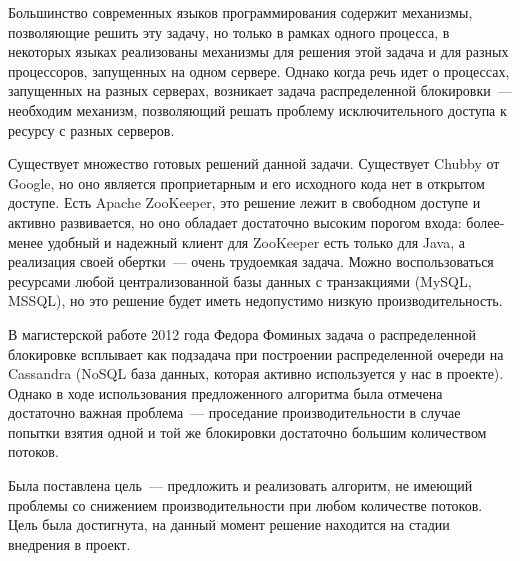 Большинство современных языков программирования содержит механизмы, позволяющие решить эту задачу, но только в рамках одного процесса, в некоторых языках реализованы механизмы для решения этой задача и для разных процессоров, запущенных на одном сервере. Однако когда речь идет о процессах, запущенных на разных серверах, возникает задача распределенной блокировки~--- необходим механизм, позволяющий решать проблему исключительного доступа к ресурсу с разных серверов.

Существует множество готовых решений данной задачи. Существует Chubby от Google, но оно является проприетарным и его исходного кода нет в открытом доступе. Есть Apache ZooKeeper, это решение лежит в свободном доступе и активно развивается, но оно обладает достаточно высоким порогом входа: более-менее удобный и надежный клиент для ZooKeeper есть только для Java, а реализация своей обертки~--- очень трудоемкая задача. Можно воспользоваться ресурсами любой централизованной базы данных с транзакциями (MySQL, MSSQL), но это решение будет иметь недопустимо низкую производительность.

В магистерской работе 2012 года Федора Фоминых задача о распределенной блокировке всплывает как подзадача при построении распределенной очереди на Cassandra (NoSQL база данных, которая активно используется у нас в проекте). Однако в ходе использования предложенного алгоритма была отмечена достаточно важная проблема~--- проседание производительности в случае попытки взятия одной и той же блокировки достаточно большим количеством потоков.

Была поставлена цель~--- предложить и реализовать алгоритм, не имеющий проблемы со снижением производительности при любом количестве потоков. Цель была достигнута, на данный момент решение находится на стадии внедрения в проект.
